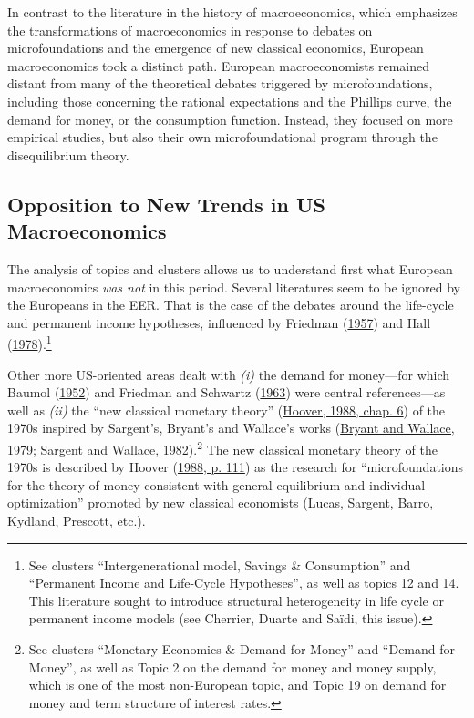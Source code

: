 \documentclass[
  12pt,
  onecolumn]{article}
\begin{document}
In contrast to the literature in the history of macroeconomics, which emphasizes the transformations of macroeconomics in response to debates on microfoundations and the emergence of new classical economics, European macroeconomics took a distinct path. European macroeconomists remained distant from many of the theoretical debates triggered by microfoundations, including those concerning the rational expectations and the Phillips curve, the demand for money, or the consumption function. Instead, they focused on more empirical studies, but also their own microfoundational program through the disequilibrium theory.

\hypertarget{opposition-trends}{%
\subsection{Opposition to New Trends in US Macroeconomics}\label{opposition-trends}}

The analysis of topics and clusters allows us to understand first what European macroeconomics \emph{was not} in this period. Several literatures seem to be ignored by the Europeans in the EER. That is the case of the debates around the life-cycle and permanent income hypotheses, influenced by Friedman (\protect\hyperlink{ref-friedman1957}{1957}) and Hall (\protect\hyperlink{ref-hall1978b}{1978}).\footnote{See clusters ``Intergenerational model, Savings \& Consumption'' and ``Permanent Income and Life-Cycle Hypotheses'', as well as topics 12 and 14. This literature sought to introduce structural heterogeneity in life cycle or permanent income models (see Cherrier, Duarte and Saïdi, this issue).}

Other more US-oriented areas dealt with \emph{(i)} the demand for money---for which Baumol (\protect\hyperlink{ref-baumol1952}{1952}) and Friedman and Schwartz (\protect\hyperlink{ref-friedman1963}{1963}) were central references---as well as \emph{(ii)} the ``new classical monetary theory'' (\protect\hyperlink{ref-hoover1988}{Hoover, 1988, chap. 6}) of the 1970s inspired by Sargent's, Bryant's and Wallace's works (\protect\hyperlink{ref-bryant1979}{Bryant and Wallace, 1979}; \protect\hyperlink{ref-sargent1982}{Sargent and Wallace, 1982}).\footnote{See clusters ``Monetary Economics \& Demand for Money'' and ``Demand for Money'', as well as Topic 2 on the demand for money and money supply, which is one of the most non-European topic, and Topic 19 on demand for money and term structure of interest rates.} The new classical monetary theory of the 1970s is described by Hoover (\protect\hyperlink{ref-hoover1988}{1988, p. 111}) as the research for ``microfoundations for the theory of money consistent with general equilibrium and individual optimization'' promoted by new classical economists (Lucas, Sargent, Barro, Kydland, Prescott, etc.).
\end{document}
